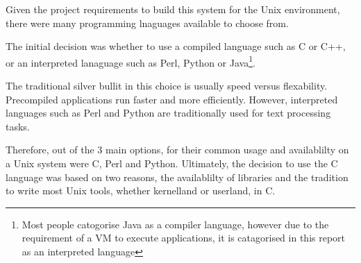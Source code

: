 
Given the project requirements to build this system for the Unix
environment, there were many programming lnaguages available to choose
from.


The initial decision was whether to use a compiled language such as C or
C++, or an interpreted lanaguage such as Perl, Python or
Java\footnote{Most people catogorise Java as a compiler language,
however due to the requirement of a VM to execute applications, it is
catagorised in this report as an interpreted language}. 


The traditional silver bullit in this choice is usually speed versus 
flexability. Precompiled applications run faster and more efficiently. 
However, interpreted languages such as Perl and Python are traditionally
used for text processing tasks. 


Therefore, out of the 3 main options, for their common usage and
availablilty on a Unix system were C, Perl and Python. Ultimately, the
decision to use the C language was based on two reasons, the
availablilty of libraries and the tradition to write most Unix tools,
whether kernelland or userland, in C.
